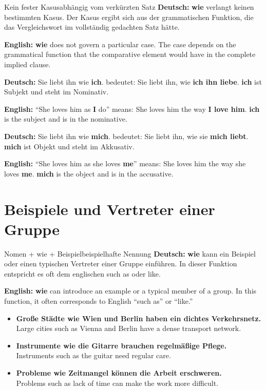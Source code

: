 \documentclass[a4paper,11pt]{article}
\newcommand{\GermanText}[1]{\textbf{Deutsch: }#1\par}
\newcommand{\EnglishText}[1]{{\small\color{SoftGray}\textbf{English: }#1\par}}
\newcommand{\ExampleItem}[2]{\item \textbf{#1}\\{\small\color{SoftGray}#2}}
\begin{document}
\begin{grammarentry}{Kein fester Kasus}{abhängig vom verkürzten Satz}
\GermanText{\textbf{wie} verlangt keinen bestimmten Kasus. Der Kasus ergibt sich aus der grammatischen Funktion, die das Vergleichswort im vollständig gedachten Satz hätte.}
\EnglishText{\textbf{wie} does not govern a particular case. The case depends on the grammatical function that the comparative element would have in the complete implied clause.}

\GermanText{\glqq Sie liebt ihn wie \textbf{ich}.\grqq{} bedeutet: Sie liebt ihn, wie \textbf{ich ihn liebe}. \textbf{ich} ist Subjekt und steht im Nominativ.}
\EnglishText{``She loves him as \textbf{I} do'' means: She loves him the way \textbf{I love him}. \textbf{ich} is the subject and is in the nominative.}

\GermanText{\glqq Sie liebt ihn wie \textbf{mich}.\grqq{} bedeutet: Sie liebt ihn, wie sie \textbf{mich liebt}. \textbf{mich} ist Objekt und steht im Akkusativ.}
\EnglishText{``She loves him as she loves \textbf{me}'' means: She loves him the way she loves \textbf{me}. \textbf{mich} is the object and is in the accusative.}
\end{grammarentry}

\section{Beispiele und Vertreter einer Gruppe}

\begin{grammarentry}{Nomen + wie + Beispiel}{beispielhafte Nennung}
\GermanText{\textbf{wie} kann ein Beispiel oder einen typischen Vertreter einer Gruppe einführen. In dieser Funktion entspricht es oft dem englischen \glqq such as\grqq{} oder \glqq like\grqq.}
\EnglishText{\textbf{wie} can introduce an example or a typical member of a group. In this function, it often corresponds to English ``such as'' or ``like.''}
\end{grammarentry}

\begin{exbox}
\begin{itemize}
\ExampleItem{Große Städte wie Wien und Berlin haben ein dichtes Verkehrsnetz.}{Large cities such as Vienna and Berlin have a dense transport network.}
\ExampleItem{Instrumente wie die Gitarre brauchen regelmäßige Pflege.}{Instruments such as the guitar need regular care.}
\ExampleItem{Probleme wie Zeitmangel können die Arbeit erschweren.}{Problems such as lack of time can make the work more difficult.}
\end{itemize}
\end{exbox}
\end{document}
